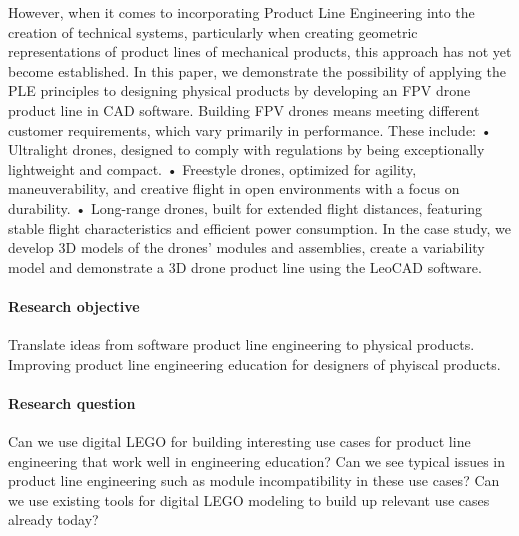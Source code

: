 \documentclass[sigconf,review]{acmart}
\begin{document}
However, when it comes to incorporating Product Line Engineering into the creation of technical systems, particularly when creating geometric representations of product lines of mechanical products, this approach has not yet become established. 
In this paper, we demonstrate the possibility of applying the PLE principles to designing physical products by developing an FPV drone product line in CAD software. Building FPV drones means meeting different customer requirements, which vary primarily in performance. These include:     
•	Ultralight drones, designed to comply with regulations by being exceptionally lightweight and compact.
•	Freestyle drones, optimized for agility, maneuverability, and creative flight in open environments with a focus on durability. 
•	Long-range drones, built for extended flight distances, featuring stable flight characteristics and efficient power consumption.
In the case study, we develop 3D models of the drones’ modules and assemblies, create a variability model and demonstrate a 3D drone product line using the LeoCAD software.



\paragraph{Research objective}

Translate ideas from software product line engineering to physical products.
Improving product line engineering education for designers of phyiscal products.

\paragraph{Research question}

Can we use digital LEGO for building interesting use cases for product line engineering that work well in engineering education?
Can we see typical issues in product line engineering such as module incompatibility in these use cases?
Can we use existing tools for digital LEGO modeling to build up relevant use cases already today?
\end{document}
